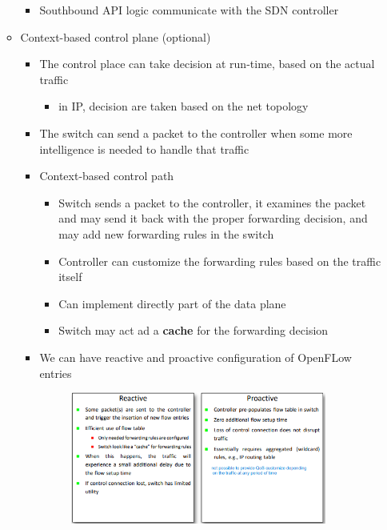 \documentclass{article}
\begin{document}
\begin{itemize}
\begin{itemize}
\begin{itemize}
            \item Southbound API logic communicate with the SDN controller
        \end{itemize}
        \item Context-based control plane (optional)
        \begin{itemize}
            \item The control place can take decision at run-time, based on the actual traffic
            \begin{itemize}
                \item in IP, decision are taken based on the net topology
            \end{itemize}
            \item The switch can send a packet to the controller when some more intelligence is needed to handle that traffic
            \item Context-based control path
            \begin{itemize}
                \item Switch sends a packet to the controller, it examines the packet and may send it back with the proper forwarding decision, and may add new forwarding rules in the switch
                \item Controller can customize the forwarding rules based on the traffic itself
                \item Can implement directly part of the data plane
                \item Switch may act ad a \textbf{cache} for the forwarding decision
            \end{itemize}
            \item We can have reactive and proactive configuration of OpenFLow entries
            \begin{figure}[h]
                \centering
                \includegraphics[width=0.90\textwidth]{figure/reactive_proactive.png}

\end{figure}
\end{itemize}
\end{itemize}
\end{itemize}
\end{document}
